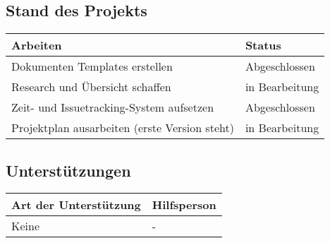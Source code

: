 \clearpage


\subsection*{Stand des Projekts}
\begin{table}[H]
    \centering
    \begin{tabular}{p{12cm} p{4cm}}
        \textbf{Arbeiten} & \textbf{Status} \\ \hline
        Dokumenten Templates erstellen & Abgeschlossen \\ \hline
        Research und Übersicht schaffen & in Bearbeitung \\ \hline
        Zeit- und Issuetracking-System aufsetzen & Abgeschlossen \\ \hline
        Projektplan ausarbeiten (erste Version steht) & in Bearbeitung \\ \hline
    \end{tabular}
\end{table}

\vspace{1cm}

\subsection*{Unterstützungen}
\begin{table}[H]
    \centering
    \begin{tabular}{p{12cm} p{4cm}}
        \textbf{Art der Unterstützung} & \textbf{Hilfsperson} \\ \hline
        Keine & - \\ \hline
    \end{tabular}
\end{table}

\vspace{1cm}

